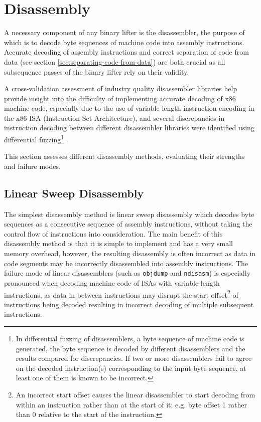 

\section{Disassembly}

A necessary component of any binary lifter is the disassembler, the purpose of which is to decode byte sequences of machine code into assembly instructions. Accurate decoding of assembly instructions and correct separation of code from data (see section \ref{sec:separating-code-from-data}) are both crucial as all subsequence passes of the binary lifter rely on their validity.

A cross-validation assessment of industry quality disassembler libraries help provide insight into the difficulty of implementing accurate decoding of x86 machine code, especially due to the use of variable-length instruction encoding in the x86 ISA (Instruction Set Architecture), and several discrepancies in instruction decoding between different disassembler libraries were identified using differential fuzzing\footnote{In differential fuzzing of disassemblers, a byte sequence of machine code is generated, the byte sequence is decoded by different disassemblers and the results compared for discrepancies. If two or more disassemblers fail to agree on the decoded instruction(s) corresponding to the input byte sequence, at least one of them is known to be incorrect.} \cite{broken_x86_disassemblers}.

This section assesses different disassembly methods, evaluating their strengths and failure modes.


\subsection{Linear Sweep Disassembly}

The simplest disassembly method is linear sweep disassembly which decodes byte sequences as a consecutive sequence of assembly instructions, without taking the control flow of instructions into consideration. The main benefit of this disassembly method is that it is simple to implement and has a very small memory overhead, however, the resulting disassembly is often incorrect as data in code segments may be incorrectly disassembled into assembly instructions. The failure mode of linear disassemblers (such as \texttt{objdump} and \texttt{ndisasm}) is especially pronounced when decoding machine code of ISAs with variable-length instructions, as data in between instructions may disrupt the start offset\footnote{An incorrect start offset causes the linear disassembler to start decoding from within an instruction rather than at the start of it; e.g. byte offset 1 rather than 0 relative to the start of the instruction.} of instructions being decoded resulting in incorrect decoding of multiple subsequent instructions.

